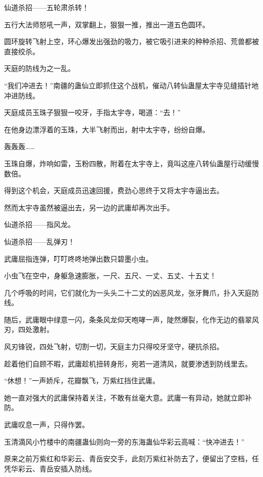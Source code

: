 
\begin{this_body}



仙道杀招——五轮肃杀转！

五行大法师怒吼一声，双掌翻上，狠狠一推，推出一道五色圆环。

圆环旋转飞射上空，环心爆发出强劲的吸力，被它吸引进来的种种杀招、荒兽都被直接绞杀。

天庭的防线为之一乱。

“我们冲进去！”南疆的蛊仙立即抓住这个战机，催动八转仙蛊屋太宇寺见缝插针地冲进防线。

天庭成员玉珠子狠狠一咬牙，手指太宇寺，喝道：“去！”

在他身边漂浮着的玉珠，大半飞射而出，射中太宇寺，纷纷自爆。

轰轰轰……

玉珠自爆，炸响如雷，玉粉四散，附着在太宇寺上，竟叫这座八转仙蛊屋行动缓慢数倍。

得到这个机会，天庭成员迅速回援，费劲心思终于又将太宇寺逼出去。

然而太宇寺虽然被逼出去，另一边的武庸却再次出手。

仙道杀招——指风龙。

仙道杀招——乱弹刃！

武庸屈指连弹，叮叮咚咚地弹出数只碧墨小虫。

小虫飞在空中，身躯急速膨胀，一尺、五尺、一丈、五丈、十五丈！

几个呼吸的时间，它们就化为一头头二十二丈的凶恶风龙，张牙舞爪，扑入天庭防线。

随后，武庸眼中绿意一闪，条条风龙仰天咆哮一声，陡然爆裂，化作无边的翡翠风刃，四处激射。

风刃锋锐，四处飞射，切割一切，天庭主力只得咬牙坚守，硬抗杀招。

趁着他们自顾不暇，武庸趁机扭转身形，宛若一道清风，就要渗透到防线里去。

“休想！”一声娇斥，花瓣飘飞，万紫红挡住武庸。

她一直对强大的武庸保持着关注，不敢有丝毫大意。武庸一有异动，她就立即补防。

武庸叹息一声，只得作罢。

玉清滴风小竹楼中的南疆蛊仙则向一旁的东海蛊仙华彩云高喊：“快冲进去！”

原来之前万紫红和华彩云、青岳安交手，此刻万紫红补防去了，便留出了空档，任凭华彩云、青岳安插入防线。


\end{this_body}
